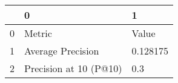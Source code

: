 \begin{tabular}{lll}
\toprule
{} &                       0 &         1 \\
\midrule
0 &                  Metric &     Value \\
1 &       Average Precision &  0.128175 \\
2 &  Precision at 10 (P@10) &       0.3 \\
\bottomrule
\end{tabular}
